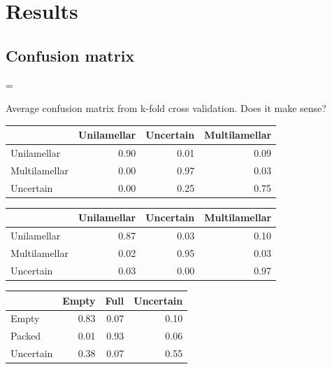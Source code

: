 \documentclass[a4paper, 11pt, table]{article}
\newenvironment{warning}
  {\par\begin{mdframed}[linewidth=2pt,linecolor=red]%
    \begin{list}{}{\leftmargin=1cm
                   \labelwidth=\leftmargin}\item[\Large\ding{43}]}
  {\end{list}\end{mdframed}\par}
\begin{document}
\begin{landscape}
\end{landscape}

\section{Results}

\subsection{Confusion matrix}

\begin{warning}
Average confusion matrix from k-fold cross validation. Does it make sense? 
\end{warning}

\begin{center}
\begin{tabular}{lrrr}
\hline
 & Unilamellar & Uncertain & Multilamellar \\ 
\hline 
Unilamellar & 0.90 & 0.01 & 0.09 \\ 
Multilamellar & 0.00 & 0.97 & 0.03 \\ 
Uncertain & 0.00 & 0.25 & 0.75 \\ 
\end{tabular} 
\end{center}

\begin{center}
\begin{tabular}{lrrr}
\hline
 & Unilamellar & Uncertain & Multilamellar \\ 
\hline 
Unilamellar & 0.87 & 0.03 & 0.10 \\ 
Multilamellar & 0.02 & 0.95 & 0.03 \\ 
Uncertain & 0.03 & 0.00 & 0.97 \\ 
\end{tabular} 
\end{center}

\begin{center}
\begin{tabular}{lrrr}
\hline
 & Empty & Full & Uncertain \\ 
\hline 
Empty & 0.83 & 0.07 & 0.10 \\ 
Packed & 0.01 & 0.93 & 0.06 \\ 
Uncertain & 0.38 & 0.07 & 0.55 \\ 
\end{tabular} 
\end{center}
\end{document}

